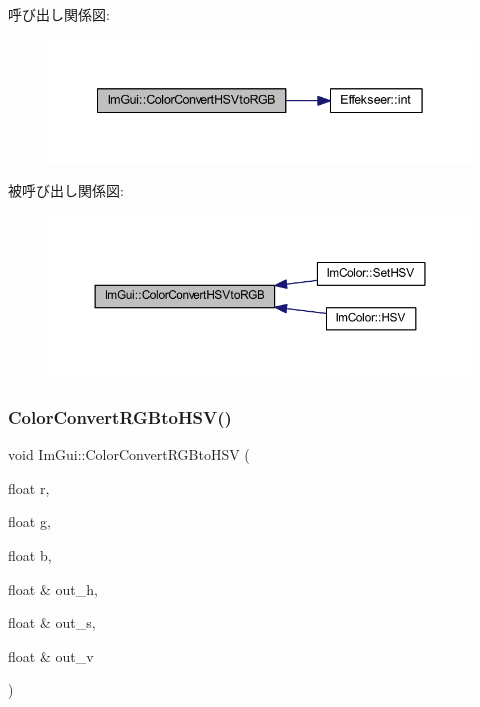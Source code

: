 呼び出し関係図\+:\nopagebreak
\begin{figure}[H]
\begin{center}
\leavevmode
\includegraphics[width=342pt]{namespace_im_gui_a074427678b3e56378b7dcdefa4c8b5c7_cgraph}
\end{center}
\end{figure}
被呼び出し関係図\+:\nopagebreak
\begin{figure}[H]
\begin{center}
\leavevmode
\includegraphics[width=350pt]{namespace_im_gui_a074427678b3e56378b7dcdefa4c8b5c7_icgraph}
\end{center}
\end{figure}
\mbox{\label{namespace_im_gui_aaed5ed34aaaa02b61cbb67598c0ad9ca}} 
\subsubsection{\texorpdfstring{Color\+Convert\+R\+G\+Bto\+H\+S\+V()}{ColorConvertRGBtoHSV()}}
{\footnotesize\ttfamily void Im\+Gui\+::\+Color\+Convert\+R\+G\+Bto\+H\+SV (\begin{DoxyParamCaption}\item[{float}]{r,  }\item[{float}]{g,  }\item[{float}]{b,  }\item[{float \&}]{out\+\_\+h,  }\item[{float \&}]{out\+\_\+s,  }\item[{float \&}]{out\+\_\+v }\end{DoxyParamCaption})}



